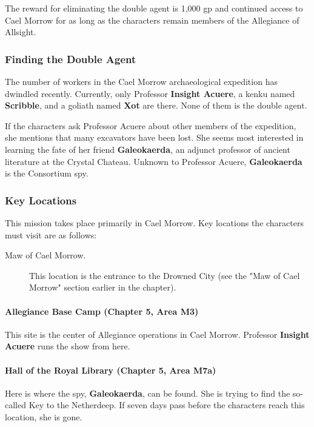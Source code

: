 \documentclass[letterpaper, 11pt, bg=full, twocolumn]{dndbook}
\begin{document}
The reward for eliminating the double agent is 1,000 gp and continued access to Cael Morrow for as long as the characters remain members of the Allegiance of Allsight.

\subsubsection{Finding the Double Agent}

The number of workers in the Cael Morrow archaeological expedition has dwindled recently. Currently, only Professor \textbf{Insight Acuere}, a kenku named \textbf{Scribble}, and a goliath named \textbf{Xot} are there. None of them is the double agent.

If the characters ask Professor Acuere about other members of the expedition, she mentions that many excavators have been lost. She seems most interested in learning the fate of her friend \textbf{Galeokaerda}, an adjunct professor of ancient literature at the Crystal Chateau. Unknown to Professor Acuere, \textbf{Galeokaerda} is the Consortium spy.

\subsubsection{Key Locations}

This mission takes place primarily in Cael Morrow. Key locations the characters must visit are as follows:

\begin{description}
\item[Maw of Cael Morrow.] This location is the entrance to the Drowned City (see the "Maw of Cael Morrow" section earlier in the chapter).
\end{description}

\paragraph{Allegiance Base Camp (Chapter 5, Area M3)}

This site is the center of Allegiance operations in Cael Morrow. Professor \textbf{Insight Acuere} runs the show from here.

\paragraph{Hall of the Royal Library (Chapter 5, Area M7a)}

Here is where the spy, \textbf{Galeokaerda}, can be found. She is trying to find the so-called Key to the Netherdeep. If seven days pass before the characters reach this location, she is gone.
\end{document}
